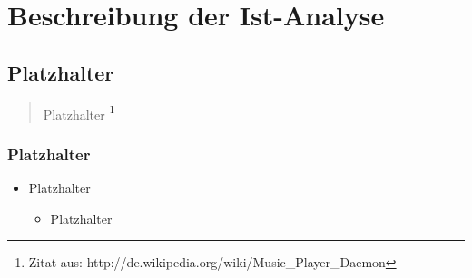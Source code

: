 \chapter{Beschreibung der Ist-Analyse}

\section{Platzhalter}

\begin{quote}
Platzhalter
\footnote{Zitat aus: http://de.wikipedia.org/wiki/Music\_Player\_Daemon}
\end{quote}

\newpage
\subsection{Platzhalter}

\renewcommand{\labelitemi}{•}
\begin{itemize}
	\item Platzhalter
	
	\renewcommand{\labelitemi}{--}
	\begin{itemize}
		\item Platzhalter
	\end{itemize}
\end{itemize}
